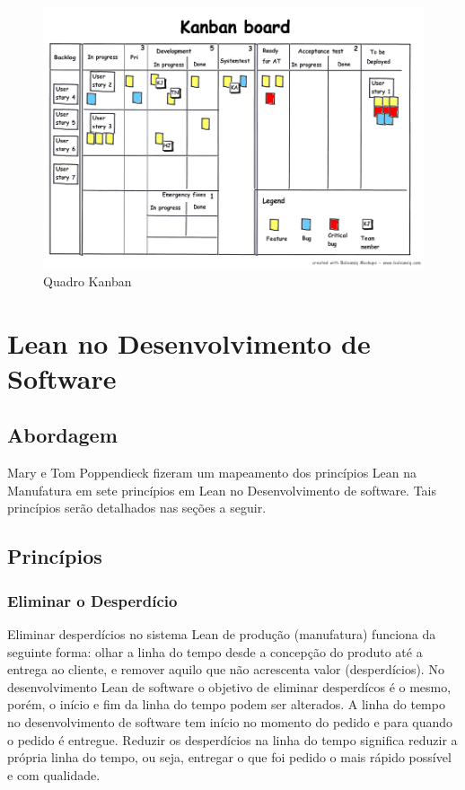 \begin{figure}[h]
		\centering
		\label{fig01}
			\includegraphics[scale=0.4]{figuras/kanban.png}
		\caption{Quadro Kanban}
\end{figure}

\section[Lean no Desenvolvimento de Software]{Lean no Desenvolvimento de Software}

\subsection[Abordagem]{Abordagem}

Mary e Tom Poppendieck fizeram um mapeamento dos princípios Lean na Manufatura em sete princípios em Lean no Desenvolvimento de software. Tais princípios serão detalhados nas seções a seguir. 

\subsection[Princípios]{Princípios}

\subsubsection[Eliminar o Desperdício]{Eliminar o Desperdício}

Eliminar desperdícios no sistema Lean de produção (manufatura) funciona da seguinte forma: olhar a linha do tempo desde a concepção do produto até a entrega ao cliente, e remover aquilo que não acrescenta valor (desperdícios). No desenvolvimento Lean de software o objetivo de eliminar desperdícos é o mesmo, porém, o início e  fim da linha do tempo podem ser alterados. A linha do tempo no desenvolvimento de software tem início no momento do pedido e para quando o pedido é entregue. Reduzir os desperdícios na linha do tempo significa reduzir a própria linha do tempo, ou seja, entregar o que foi pedido o mais rápido possível e com qualidade.

